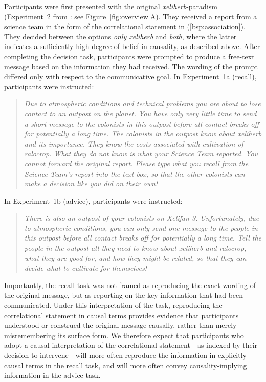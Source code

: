 \documentclass[10pt,letterpaper]{article}
\newcommand{\mf}[1]{\textcolor{BrickRed}{[MF: #1]}}
\begin{document}
Participants were first presented with the original \textit{xeliherb}-paradism (Experiment~2 from \citet{lassiter2024rationality}: see Figure~\ref{fig:overview}A). 
They received a report from a science team in the form of the correlational statement in (\ref{bsp:association}).
They decided between the options \textit{only xeliherb} and \textit{both}, where the latter indicates a sufficiently high degree of belief in causality, as described above. 
After completing the decision task, participants were prompted to produce a free-text message based on the information they had received. The wording of the prompt differed only with respect to the communicative goal. In Experiment~1a (recall), participants were instructed: %
%
\begin{quote}
\small
\emph{Due to atmospheric conditions and technical problems you are about to lose contact to an outpost on the planet. You have only very little time to send a short message to the colonists in this outpost before all contact breaks off for potentially a long time. The colonists in the outpost know about xeliherb and its importance. They know the costs associated with cultivation of ralocrop. What they do not know is what your Science Team reported. You cannot forward the original report. Please type what you recall from the Science Team's report into the text box, so that the other colonists can make a decision like you did on their own!}
\end{quote}
%
In Experiment~1b (advice), participants were instructed:
%
\begin{quote}
\small
\emph{There is also an outpost of your colonists on Xelifan-3. Unfortunately, due to atmospheric conditions, you can only send one message to the people in this outpost before all contact breaks off for potentially a long time. Tell the people in the outpost all they need to know about xeliherb and ralocrop, what they are good for, and how they might be related, so that they can decide what to cultivate for themselves!}
\end{quote}
%
Importantly, the recall task was not framed as reproducing the exact wording of the original message, but as reporting on the key information that had been communicated.
Under this interpretation of the task, reproducing the correlational statement in causal terms provides evidence that participants understood or construed the original message causally, rather than merely misremembering its surface form.
We therefore expect that participants who adopt a causal interpretation of the correlational statement—as indexed by their decision to intervene—will more often reproduce the information in explicitly causal terms in the recall task, and will more often convey causality-implying information in the advice task.
\end{document}
